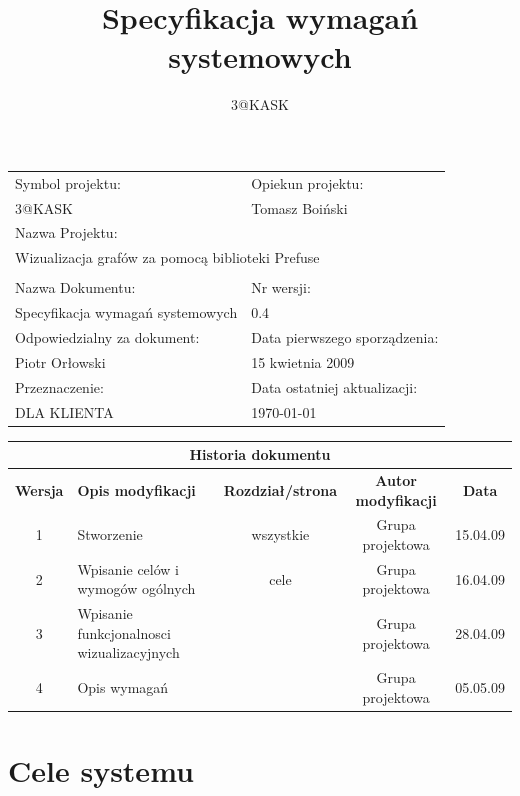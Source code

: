 \documentclass[a4paper,10pt]{article}
\title{Specyfikacja wymagań systemowych}
\author{3@KASK}
\begin{document}



\maketitle


\begin{center}
\begin{tabular}{|p{7cm}|p{7cm}|}
\hline
Symbol projektu: & Opiekun projektu:   \tabularnewline 
3@KASK & Tomasz Boiński    \tabularnewline \hline
\multicolumn{2}{|l|}{Nazwa Projektu: } \tabularnewline
\multicolumn{2}{|l|}{Wizualizacja grafów za pomocą biblioteki Prefuse } \tabularnewline 
\hline
\multicolumn{2}{l}{ } \tabularnewline %
\hline 
Nazwa Dokumentu: & Nr wersji:   \tabularnewline 
Specyfikacja wymagań systemowych & 0.4 \tabularnewline \hline
Odpowiedzialny za dokument: & Data pierwszego sporządzenia:   \tabularnewline 
Piotr Orłowski & 15 kwietnia 2009 \tabularnewline \hline
Przeznaczenie: & Data ostatniej aktualizacji:   \tabularnewline 
DLA KLIENTA & \today \tabularnewline \hline
\end{tabular}
\end{center}


\begin{center}
\begin{tabular}{|c|p{4cm}|c|c|c|}
\multicolumn{5}{c}{\textbf{Historia dokumentu}} \tabularnewline \hline
\textbf{Wersja} & \textbf{Opis modyfikacji} & \textbf{Rozdział/strona} & \textbf{Autor modyfikacji} & \textbf{Data} \tabularnewline \hline 
1 & Stworzenie & wszystkie & Grupa projektowa & 15.04.09 \tabularnewline \hline
2 & Wpisanie celów i wymogów ogólnych  & cele & Grupa projektowa & 16.04.09\tabularnewline \hline
3 & Wpisanie funkcjonalnosci wizualizacyjnych & & Grupa projektowa & 28.04.09\tabularnewline \hline
4 & Opis wymagań & & Grupa projektowa & 05.05.09\tabularnewline \hline
\end{tabular}
\end{center}


\newpage
\tableofcontents
\newpage

\section{Cele systemu}

\end{document}
